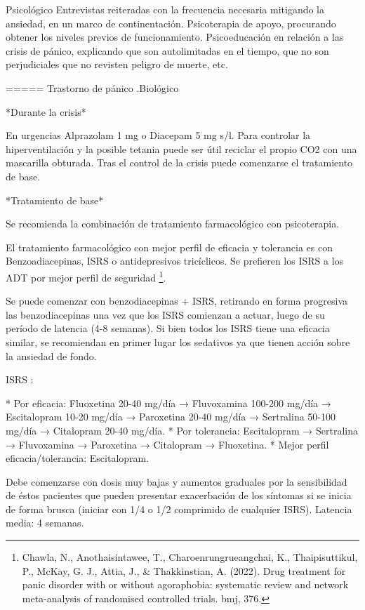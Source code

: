 \documentclass{scrbook}
\begin{document}
Psicológico Entrevistas reiteradas con la frecuencia necesaria mitigando la ansiedad, en un marco de continentación. Psicoterapia de apoyo, procurando obtener los niveles previos de funcionamiento. Psicoeducación en relación a las crisis de pánico, explicando que son autolimitadas en el tiempo, que no son perjudiciales que no revisten peligro de muerte, etc.

===== Trastorno de pánico
.Biológico

*Durante la crisis*

En urgencias Alprazolam 1 mg o Diacepam 5 mg s/l. Para controlar la hiperventilación y la posible tetania puede ser útil reciclar el propio CO2 con una mascarilla obturada. Tras el control de la crisis puede comenzarse el tratamiento de base.

*Tratamiento de base*

Se recomienda la combinación de tratamiento farmacológico con psicoterapia. 

El tratamiento farmacológico con mejor perfil de eficacia y tolerancia es con Benzoadiacepinas, ISRS o antidepresivos tricíclicos. Se prefieren los ISRS a los ADT por mejor perfil de seguridad \footnote{Chawla, N., Anothaisintawee, T., Charoenrungrueangchai, K., Thaipisuttikul, P., McKay, G. J., Attia, J., \& Thakkinstian, A. (2022). Drug treatment for panic disorder with or without agoraphobia: systematic review and network meta-analysis of randomised controlled trials. bmj, 376.}.

Se puede comenzar con benzodiacepinas + ISRS, retirando en forma progresiva las benzodiacepinas una vez que los ISRS comienzan a actuar, luego de su período de latencia (4-8 semanas). Si bien todos los ISRS tiene una eficacia similar, se recomiendan en primer lugar los sedativos ya que tienen acción sobre la ansiedad de fondo.

ISRS : 

* Por eficacia: Fluoxetina 20-40 mg/día → Fluvoxamina 100-200 mg/día → Escitalopram 10-20 mg/día → Paroxetina 20-40 mg/día → Sertralina 50-100 mg/día → Citalopram 20-40 mg/día.
* Por tolerancia: Escitalopram → Sertralina → Fluvoxamina → Paroxetina → Citalopram → Fluoxetina.
* Mejor perfil eficacia/tolerancia: Escitalopram.

Debe comenzarse con dosis muy bajas y aumentos graduales por la sensibilidad de éstos pacientes que pueden presentar exacerbación de los síntomas si se inicia de forma brusca (iniciar con 1/4 o 1/2 comprimido de cualquier ISRS). Latencia media: 4 semanas.
\end{document}
